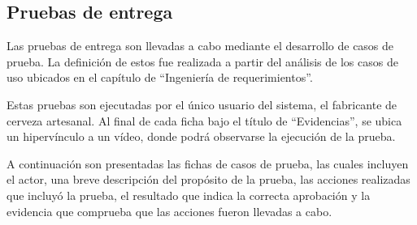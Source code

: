 \subsection{Pruebas de entrega}

\par Las pruebas de entrega son llevadas a cabo mediante el desarrollo de casos de prueba. La definición de estos fue realizada a partir del análisis de los casos de uso ubicados en el capítulo de ``Ingeniería de requerimientos''.

\par Estas pruebas son ejecutadas por el único usuario del sistema, el fabricante de cerveza artesanal. Al final de cada ficha bajo el título de ``Evidencias'', se ubica un hipervínculo a un vídeo, donde podrá observarse la ejecución de la prueba.

\par A continuación son presentadas las fichas de casos de prueba, las cuales incluyen el actor, una breve descripción del propósito de la prueba, las acciones realizadas que incluyó la prueba, el resultado que indica la correcta aprobación y la evidencia que comprueba que las acciones fueron llevadas a cabo.


